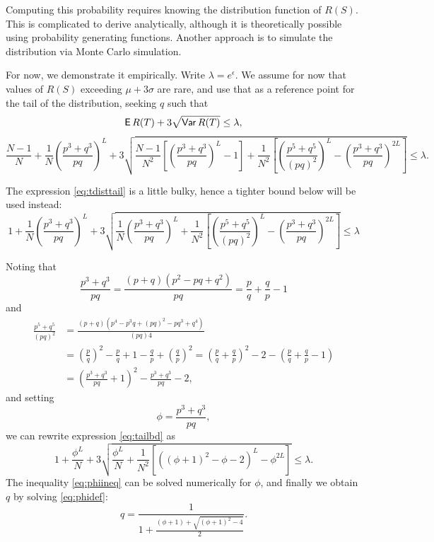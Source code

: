 \documentclass[11pt]{article}
\begin{document}
Computing this probability requires knowing the distribution function of $R(S)$.
This is complicated to derive analytically, although it is theoretically possible using probability generating functions.
Another approach is to simulate the distribution via Monte Carlo simulation.

For now, we demonstrate it empirically.
Write $\lambda = e^\epsilon$. We assume for now that values of $R(S)$ exceeding $\mu + 3\sigma$ are rare, and use that as a reference point for the tail of the distribution, seeking $q$ such that
\begin{equation*}
\operatorname{\mathsf{E}} R(T) + 3\sqrt{\operatorname{\mathsf{Var}} R(T)}  \leq \lambda,
\end{equation*}
\ie
\begin{equation} \label{eq:tdisttail}
\frac{N-1}{N} + \frac{1}{N} \left ( \frac{p^3 + q^3}{pq} \right )^{L} + 3\sqrt{\frac{N-1}{N^2} \left [  \left ( \frac{p^3 + q^3}{pq} \right )^L - 1 \right ]   +  \frac{1}{N^2} \left [ \left ( \frac{p^5 + q^5}{(pq)^2} \right )^{L}  - \left ( \frac{p^3 + q^3}{pq} \right )^{2L} \right ] }  \leq \lambda.
\end{equation}

The expression \eqref{eq:tdisttail} is a little bulky, hence a tighter bound below will be used instead:
\begin{equation} \label{eq:tailbd}
1 + \frac{1}{N} \left ( \frac{p^3 + q^3}{pq} \right )^{L} + 3\sqrt{\frac{1}{N} 
 \left ( \frac{p^3 + q^3}{pq} \right )^L +  \frac{1}{N^2} \left [ \left ( \frac{p^5 + q^5}{(pq)^2} \right )^{L}  - \left ( \frac{p^3 + q^3}{pq} \right )^{2L} \right ] }  \le \lambda
\end{equation}

Noting that
\[ \frac{p^3 + q^3}{pq} = \frac{(p+q)(p^2-pq+q^2)}{pq} = \frac{p}{q}  + \frac{q}{p} - 1 \]
and
\begin{align*}
 \frac{p^5 + q^5}{(pq)^2} &=  \frac{(p+q)(p^4-p^3q+(pq)^2 - pq^3 + q^4)}{(pq)4} \\
 &= \left (\frac{p}{q}\right )^2  - \frac{p}{q}  +1 - \frac{q}{p} +  \left (\frac{q}{p}\right )^2
 = \left (\frac{p}{q} + \frac{q}{p}\right )^2 -2 - \left ( \frac{p}{q}  + \frac{q}{p} - 1 \right ) \\
 &= \left (  \frac{p^3 + q^3}{pq}  + 1 \right )^2 -  \frac{p^3 + q^3}{pq} - 2,
\end{align*}
and setting
\begin{equation} \label{eq:phidef}
\phi = \frac{p^3 + q^3}{pq},
\end{equation}
we can rewrite expression \eqref{eq:tailbd} as
\begin{equation} \label{eq:phiineq}
1 + \frac{\phi^L}{N} + 3\sqrt{\frac{\phi^L}{N} 
+  \frac{1}{N^2} \left [ \left ( (\phi + 1)^2 - \phi -2  \right )^{L}  -  \phi^{2L} \right ] }  \leq \lambda.
\end{equation}
The inequality \eqref{eq:phiineq} can be solved numerically for $\phi$, and finally we obtain $q$ by solving \eqref{eq:phidef}:
\begin{equation}
q = \frac{1}{1 + \frac{(\phi+1) + \sqrt{(\phi+1)^2 -4}}{2}}.
\end{equation}
\end{document}

